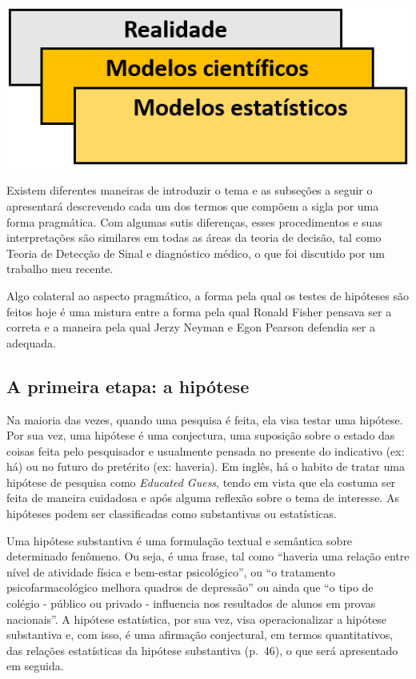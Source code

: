 \documentclass[
]{book}
\begin{document}
\includegraphics{./img/cap_inferencia_modelos_estatisticos.png}

Existem diferentes maneiras de introduzir o tema e as subseções a seguir
o apresentará descrevendo cada um dos termos que compõem a sigla por uma
forma pragmática. Com algumas sutis diferenças, esses procedimentos e
suas interpretações são similares em todas as áreas da teoria de
decisão, tal como Teoria de Detecção de Sinal e diagnóstico médico, o
que foi discutido por um trabalho meu recente.

Algo colateral ao aspecto pragmático, a forma pela qual os testes de
hipóteses são feitos hoje é uma mistura entre a forma pela qual Ronald
Fisher pensava ser a correta e a maneira pela qual Jerzy Neyman e Egon
Pearson defendia ser a adequada.

\hypertarget{a-primeira-etapa-a-hipuxf3tese}{%
\subsection{A primeira etapa: a
hipótese}\label{a-primeira-etapa-a-hipuxf3tese}}

Na maioria das vezes, quando uma pesquisa é feita, ela visa testar uma
hipótese. Por sua vez, uma hipótese é uma conjectura, uma suposição
sobre o estado das coisas feita pelo pesquisador e usualmente pensada no
presente do indicativo (ex: há) ou no futuro do pretérito (ex: haveria).
Em inglês, há o habito de tratar uma hipótese de pesquisa como
\emph{Educated Guess}, tendo em vista que ela costuma ser feita de
maneira cuidadosa e após alguma reflexão sobre o tema de interesse. As
hipóteses podem ser classificadas como substantivas ou estatísticas.

Uma hipótese substantiva é uma formulação textual e semântica sobre
determinado fenômeno. Ou seja, é uma frase, tal como ``haveria uma
relação entre nível de atividade física e bem-estar psicológico'', ou
``o tratamento psicofarmacológico melhora quadros de depressão'' ou
ainda que ``o tipo de colégio - público ou privado - influencia nos
resultados de alunos em provas nacionais''. A hipótese estatística, por
sua vez, visa operacionalizar a hipótese substantiva e, com isso, é uma
afirmação conjectural, em termos quantitativos, das relações
estatísticas da hipótese substantiva (p.~46), o que será apresentado em
seguida.
\end{document}
